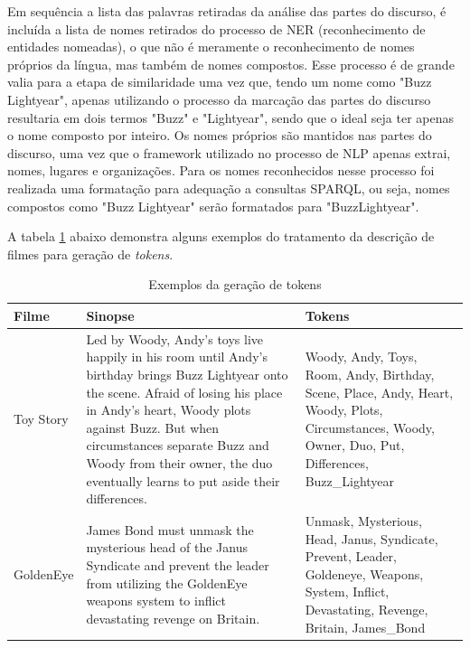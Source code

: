 Em sequência a lista das palavras retiradas da análise das partes do discurso, é incluída a lista de nomes retirados do processo de \ac{NER} (reconhecimento de entidades nomeadas), o que não é meramente o reconhecimento de nomes próprios da língua, mas também de nomes compostos. Esse processo é de grande valia para a etapa de similaridade uma vez que, tendo um nome como "Buzz Lightyear", apenas utilizando o processo da marcação das partes do discurso resultaria em dois termos "Buzz" e "Lightyear", sendo que o ideal seja ter apenas o nome composto por inteiro. Os nomes próprios são mantidos nas partes do discurso, uma vez que o framework utilizado no processo de \ac{NLP} apenas extrai, nomes, lugares e organizações. Para os nomes reconhecidos nesse processo foi realizada uma formatação para adequação a consultas \ac{SPARQL}, ou seja, nomes compostos como "Buzz Lightyear" serão formatados para "Buzz\textunderscore Lightyear".

A tabela \ref{tab:nlp_example} abaixo demonstra alguns exemplos do tratamento da descrição de filmes para geração de \textit{tokens}. 

\begin{table}[]
	\label{tab:nlp_example}
	\centering
	\caption{Exemplos da geração de tokens}
	\def\arraystretch{1.3} %
	\begin{tabular}{|p{2cm}|p{6cm}|p{6cm}|}
	\hline
	\textbf{Filme} & \textbf{Sinopse} & \textbf{Tokens} \\ \hline
	Toy Story & Led by Woody, Andy's toys live happily in his room until Andy's birthday brings Buzz Lightyear onto the scene. Afraid of losing his place in Andy's heart, Woody plots against Buzz. But when circumstances separate Buzz and Woody from their owner, the duo eventually learns to put aside their differences.& Woody, Andy, Toys, Room, Andy, Birthday, Scene, Place, Andy, Heart, Woody, Plots, Circumstances, Woody, Owner, Duo, Put, Differences, Buzz\_Lightyear \\ \hline
	GoldenEye & James Bond must unmask the mysterious head of the Janus Syndicate and prevent the leader from utilizing the GoldenEye weapons system to inflict devastating revenge on Britain. & Unmask, Mysterious, Head, Janus, Syndicate, Prevent, Leader, Goldeneye, Weapons, System, Inflict, Devastating, Revenge, Britain, James\_Bond \\ \hline
	\end{tabular}
\end{table}

\label{ssec:sim_rec}
